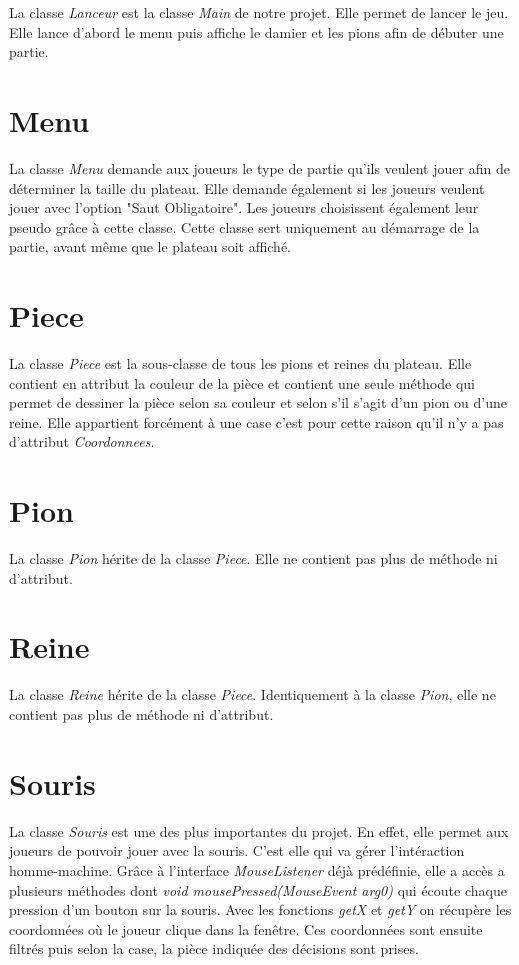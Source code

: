 \documentclass[12,french]{report}
\begin{document}
La classe \textit{Lanceur} est la classe \textit{Main} de notre projet. Elle permet de lancer le jeu. Elle lance d'abord le menu puis affiche le damier et les pions afin de débuter une partie.

\section{Menu}

La classe \textit{Menu} demande aux joueurs le type de partie qu'ils veulent jouer afin de déterminer la taille du plateau. Elle demande également si les joueurs veulent jouer avec l'option "Saut Obligatoire". Les joueurs choisissent également leur pseudo grâce à cette classe. Cette classe sert uniquement au démarrage de la partie, avant même que le plateau soit affiché.

\section{Piece}

La classe \textit{Piece} est la sous-classe de tous les pions et reines du plateau. Elle contient en attribut la couleur de la pièce et contient une seule méthode qui permet de dessiner la pièce selon sa couleur et selon s'il s'agit d'un pion ou d'une reine. Elle appartient forcément à une case c'est pour cette raison qu'il n'y a pas d'attribut \textit{Coordonnees}.

\section{Pion}

La classe \textit{Pion} hérite de la classe \textit{Piece}. Elle ne contient pas plus de méthode ni d'attribut.

\section{Reine}

La classe \textit{Reine} hérite de la classe \textit{Piece}. Identiquement à la classe \textit{Pion}, elle ne contient pas plus de méthode ni d'attribut.
\section{Souris}

La classe \textit{Souris} est une des plus importantes du projet. En effet, elle permet aux joueurs de pouvoir jouer avec la souris. C'est elle qui va gérer l'intéraction homme-machine. Grâce à l'interface \textit{MouseListener} déjà prédéfinie, elle a accès a plusieurs méthodes dont \textit{void mousePressed(MouseEvent arg0)} qui écoute chaque pression d'un bouton sur la souris. Avec les fonctions \textit{getX} et \textit{getY} on récupère les coordonnées où le joueur clique dans la fenêtre. Ces coordonnées sont ensuite filtrés puis selon la case, la pièce indiquée des décisions sont prises.
\end{document}
